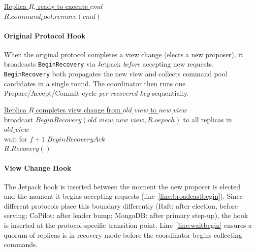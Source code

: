 \documentclass[twocolumn]{article}
\begin{document}
\begin{algorithm}
\caption{Original Protocol -- Execute (with GC)}
\label{alg:execute_gc}
\setcounter{AlgoLine}{26}

\underline{Replica $R$, ready to execute $cmd$}\\
$R.command_pool.remove(cmd)$
\end{algorithm}



\paragraph{Original Protocol Hook}
When the original protocol completes a view change (elects a new proposer), it broadcasts \texttt{BeginRecovery} via Jetpack \emph{before} accepting new requests. \texttt{BeginRecovery} both propagates the new view and collects command pool candidates in a single round. The coordinator then runs one Prepare/Accept/Commit cycle \emph{per recovered key} sequentially.


\begin{algorithm}
\caption{Original -- Trigger Recovery}
\label{alg:trigger_recovery}
\setcounter{AlgoLine}{32}

\underline{Replica $R$ completes view change from $old\_view$ to $new\_view$}\\
broadcast $BeginRecovery(old\_view, new\_view, R.oepoch)$ to all replicas in $old\_view$\label{line:broadcastbegin}\\
wait for $f+1$ $BeginRecoveryAck$\label{line:waitbegin}\\
$R.Recovery()$
\end{algorithm}

\paragraph{View Change Hook}
The Jetpack hook is inserted between the moment the new proposer is elected and the moment it begins accepting requests (line~\ref{line:broadcastbegin}). Since different protocols place this boundary differently (Raft: after election, before serving; CoPilot: after leader bump; MongoDB: after primary step-up), the hook is inserted at the protocol-specific transition point. Line~\ref{line:waitbegin} ensures a quorum of replicas is in recovery mode before the coordinator begins collecting commands.
\end{document}
